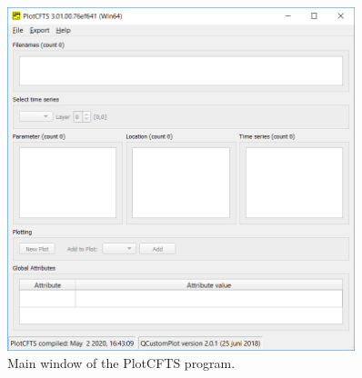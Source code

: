 \documentclass{deltares_memo}
\newcommand{\plotcfts}{PlotCFTS\xspace}
\begin{document}
\begin{figure}[H]
    \centering    
    \includegraphics[width=0.9\textwidth]{pictures/main_plotcfts.png}
    \caption{Main window of the \plotcfts program.\label{fig:plotcfts_main}}
\end{figure}
\end{document}
